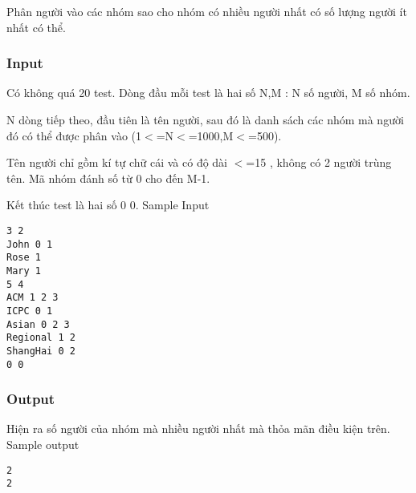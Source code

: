 



   Phân người vào các nhóm sao cho nhóm có nhiều người nhất có số lượng người ít nhất có thể.  

\subsubsection{   Input  }

   Có không quá 20 test. Dòng đầu mỗi test là hai số N,M : N số người, M số nhóm.  

   N dòng tiếp theo, đầu tiên là tên người, sau đó là danh sách các nhóm mà người đó có thể được phân vào (1$<$=N$<$=1000,M$<$=500).  

   Tên người chỉ gồm kí tự chữ cái và có độ dài  $<$=15 , không có 2 người trùng tên. Mã nhóm đánh số từ 0 cho đến M-1.  

   Kết thúc test là hai số 0 0.       Sample Input    
\begin{verbatim}
3 2 
John 0 1 
Rose 1 
Mary 1 
5 4 
ACM 1 2 3 
ICPC 0 1  
Asian 0 2 3 
Regional 1 2 
ShangHai 0 2 
0 0 
\end{verbatim}

\subsubsection{   Output  }

   Hiện ra số người của nhóm mà nhiều người nhất mà thỏa mãn điều kiện trên.       Sample output    
\begin{verbatim}
2
2
\end{verbatim}